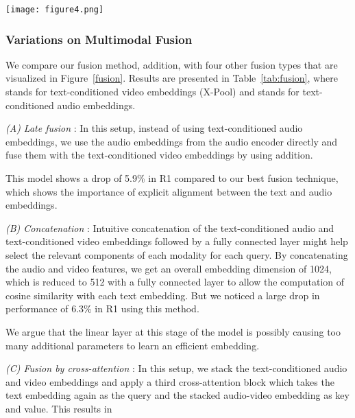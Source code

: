 \documentclass[10pt,twocolumn,letterpaper]{article}
\begin{document}
\begin{figure*}
  \centering
    \texttt{[image: figure4.png]}
  \caption{Different fusion methods corresponding to the results in Table \ref{tab:fusion} with (A) Late fusion, (B) fusion by concatenation in embedding dimension, (C) fusion by stacking the text-conditioned video and audio embeddings (D) fusion by stacking the video and audio embeddings.}
  \label{fusion}
\end{figure*}

\subsubsection{Variations on Multimodal Fusion}
\label{ablation-results}
We compare our fusion method, addition, with four other fusion types that are visualized in Figure~\ref{fusion}. Results are presented in Table~\ref{tab:fusion}, where  stands for text-conditioned video embeddings (X-Pool) and  stands for text-conditioned audio embeddings.

\noindent \textit{(A) Late fusion} : In this setup, instead of using text-conditioned audio embeddings, we use the audio embeddings from the audio encoder directly and fuse them with the text-conditioned video embeddings by using addition. 
    
    
    
    This model shows a drop of 5.9\% in R1 compared to our best fusion technique, which shows the importance of explicit alignment between the text and audio embeddings.
    
\noindent \textit{(B) Concatenation} : Intuitive concatenation of the text-conditioned audio and text-conditioned video embeddings followed by a fully connected layer might help select the relevant components of each modality for each query. By concatenating the audio and video features, we get an overall embedding dimension of 1024, which is reduced to 512 with a fully connected layer to allow the computation of cosine similarity with each text embedding. But we noticed a large drop in performance of 6.3\% in R1 using this method.
    
    
    We argue that the linear layer at this stage of the model is possibly causing too many additional parameters to learn an efficient embedding.
    
\noindent \textit{(C) Fusion by cross-attention} : In this setup, we stack the text-conditioned audio and video embeddings and apply a third cross-attention block which takes the text embedding again as the query and the stacked audio-video embedding as key and value. This results in 
    
\end{document}

